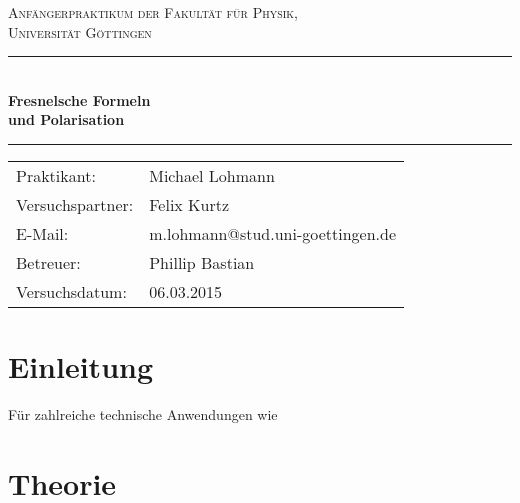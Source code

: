 \documentclass[12pt,a4paper,titlepage,headinclude,bibtotoc]{scrartcl}
\begin{document}
\begin{titlepage}
\centering
\textsc{\Large Anfängerpraktikum der Fakultät für
  Physik,\\[1.5ex] Universität Göttingen}

\vspace*{3cm}

\rule{\textwidth}{1pt}\\[0.5cm]
{\huge \bfseries
  Fresnelsche Formeln\\[1.5ex]
  und Polarisation}\\[0.5cm]
\rule{\textwidth}{1pt}

\vspace*{3cm}

\begin{Large}
\begin{tabular}{ll}
Praktikant: &  Michael Lohmann\\
Versuchspartner: &  Felix Kurtz\\
 E-Mail: & m.lohmann@stud.uni-goettingen.de\\
 Betreuer: & Phillip Bastian\\
 Versuchsdatum: & 06.03.2015\\
\end{tabular}
\end{Large}

\vspace*{0.8cm}

\begin{Large}
\end{Large}

\end{titlepage}

\tableofcontents

\newpage

\section{Einleitung}
\label{sec:einleitung}
Für zahlreiche technische Anwendungen wie 
\cite{lp20}

\section{Theorie}
\label{sec:theorie}
\end{document}
